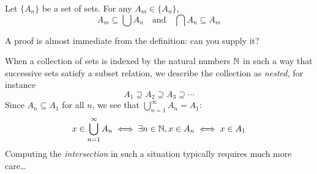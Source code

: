 \begin{lemm}{}{}
	Let $\{A_n\}$ be a set of sets. For any $A_m\in \{A_n\}$,
	\[
		A_m\subseteq\bigcup A_n\quad\text{and}\quad \bigcap A_n\subseteq A_m
	\]
\end{lemm}

A proof is almost immediate from the definition: can you supply it?




When a collection of sets is indexed by the natural numbers $\mathbb{N}$ in such a way that successive sets satisfy a subset relation, we describe the collection as \emph{nested,} for instance
\[
	A_1\supseteq A_2\supseteq A_3\supseteq\cdots
\]
Since $A_n\subseteq A_1$ for all $n$, we see that $\bigcup_{n=1}^\infty A_n=A_1$:
\[
	x\in\bigcup_{n=1}^\infty A_n\iff \exists n\in\mathbb{N}, x\in A_n  \iff x\in A_1
\]
Computing the \emph{intersection} in such a situation typically requires much more care\ldots

